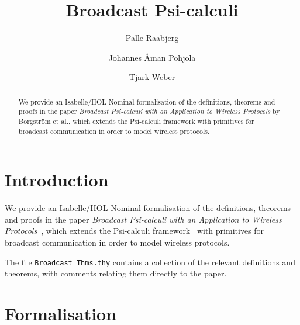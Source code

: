 \documentclass[11pt,a4paper]{article}
\begin{document}
\title{Broadcast Psi-calculi}
\author{Palle Raabjerg \and Johannes {\AA}man Pohjola \and Tjark Weber}
\maketitle

\begin{abstract}
  We provide an Isabelle/HOL-Nominal formalisation of the definitions,
  theorems and proofs in the paper \emph{Broadcast Psi-calculi with an
  Application to Wireless Protocols} by Borgstr\"om et al., which
  extends the Psi-calculi framework with primitives for broadcast
  communication in order to model wireless protocols.
\end{abstract}


\section{Introduction}

We provide an Isabelle/HOL-Nominal formalisation of the definitions,
theorems and proofs in the paper \emph{Broadcast Psi-calculi with an
Application to Wireless
Protocols}~\cite{DBLP:conf/sefm/BorgstromHJRVPP11,DBLP:journals/sosym/BorgstromHJRVPP15},
which extends the Psi-calculi
framework~\cite{DBLP:journals/corr/abs-1101-3262,DBLP:journals/jar/BengtsonPW16,DBLP:journals/afp/Bengtson12}
with primitives for broadcast communication in order to model wireless
protocols.

The file \texttt{Broadcast\_Thms.thy} contains a collection of the
relevant definitions and theorems, with comments relating them
directly to the paper.

\section{Formalisation}





\end{document}
